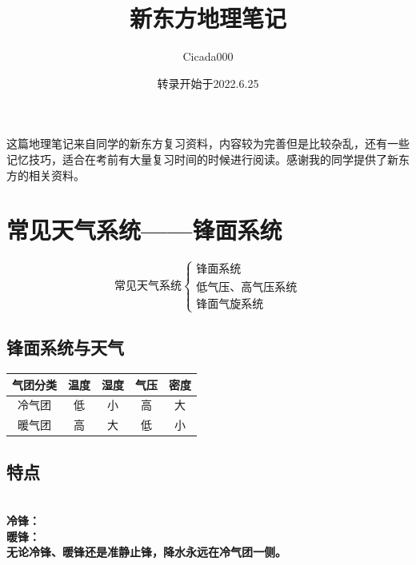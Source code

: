 \documentclass[UTF8]{ctexart}
\title{新东方地理笔记}
\author{Cicada000}
\date{转录开始于2022.6.25}
\begin{document}
    
    \maketitle

    这篇地理笔记来自同学的新东方复习资料，内容较为完善但是比较杂乱，还有一些记忆技巧，适合在考前有大量复习时间的时候进行阅读。感谢我的同学提供了新东方的相关资料。

    \thispagestyle{empty}

    \newpage

    \setcounter{page}{1}

    \section*{常见天气系统——锋面系统}

    \[
        \textbf{常见天气系统}
        \begin{cases}
            \text{锋面系统}\\
            \text{低气压、高气压系统}\\
            \text{锋面气旋系统}
        \end{cases}
    \]
    
    \subsection*{锋面系统与天气}

    \begin{table}[h]
        \begin{center}
            \begin{tabular}{ |c|c|c|c|c| }
                \hline 气团分类 & 温度 & 湿度 & 气压 & 密度 \\
                \hline 冷气团 & 低 & 小 & 高 & 大 \\
                \hline 暖气团 & 高 & 大 & 低 & 小 \\
                \hline
            \end{tabular}
        \end{center}
    \end{table}


    \subsection*{特点}
    \\
    \textbf{冷锋：}
    \\
    \textbf{暖锋：}
    \\
    \textbf{无论冷锋、暖锋还是准静止锋，降水永远在冷气团一侧。}
\end{document}
